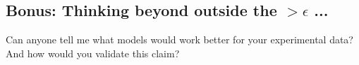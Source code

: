 \documentclass{exam}
\begin{document}
\newpage
\subsection*{Bonus: Thinking beyond outside the \(>\epsilon\) ...}
Can anyone tell me what models would work better for your experimental data? And how would you validate this claim?

  
\end{document}
